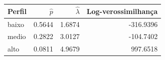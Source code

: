 
\begin{tabular}{lrrr}
\toprule
Perfil & $\hat{p}$ & $\hat{\lambda}$ & Log-verossimilhança\\
\midrule
baixo & 0.5644 & 1.6874 & -316.9396\\
medio & 0.2822 & 3.0127 & -104.7402\\
alto & 0.0811 & 4.9679 & 997.6518\\
\bottomrule
\end{tabular}
